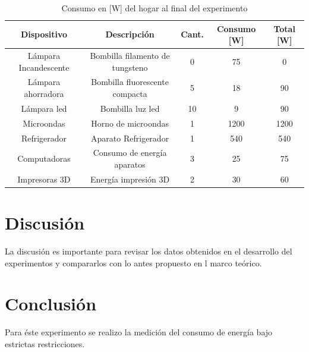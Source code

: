 \documentclass[]{article}
\begin{document}
\begin{table}[h!]
\centering

\begin{tabular}{|c|c|c|c|c|}
\hline
Dispositivo           & Descripción                     & Cant. & Consumo {[}W{]} & Total [W] \\ \hline
Lámpara Incandescente & Bombilla filamento de tungsteno & 0                  & 75              & 0           \\ \hline
Lámpara ahorradora    & Bombilla fluorescente compacta  & 5                 & 18              & 90           \\ \hline
Lámpara led           & Bombilla luz led                & 10                  & 9               & 90            \\ \hline
Microondas            & Horno de microondas             & 1                  & 1200            & 1200          \\ \hline
Refrigerador          & Aparato Refrigerador            & 1                  & 540             & 540           \\ \hline
Computadoras          & Consumo de energía aparatos     & 3                  & 25              & 75            \\ \hline
Impresoras 3D         & Energía impresión 3D            & 2                  & 30              & 60            \\ \hline
\end{tabular}
\caption{Consumo en [W] del hogar al final del experimento}
\label{tablaConsumoSegundo}
\end{table}

\section{Discusión}

La discusión es importante para revisar los datos obtenidos en el desarrollo del experimentos y compararlos con lo antes propuesto en l marco teórico.\\


\section{Conclusión}

Para éste experimento se realizo la medición del consumo de energía bajo estrictas restricciones.



%
\end{document}
